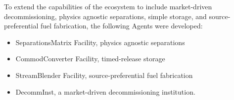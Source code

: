 
To extend the capabilities of the \Cyclus ecosystem to include market-driven 
decommissioning, physics agnostic separations, simple storage, and 
source-preferential fuel fabrication, the following Agents were developed:

\begin{itemize}
\item SeparationsMatrix Facility, physics agnostic separations
\item CommodConverter Facility, timed-release storage
\item StreamBlender Facility, source-preferential fuel fabrication 
\item DecommInst, a market-driven decommissioning institution.
\end{itemize}


